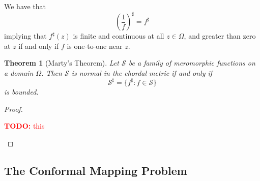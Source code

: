 \documentclass{article}
\newtheorem{theorem}{Theorem}
\newcommand{\mc}[1]{\mathcal{#1}}
\newcommand{\TODO}[1]{\begin{center}\huge{\textcolor{red}{\textbf{TODO:} #1}}\end{center}}
\begin{document}
We have that
\begin{equation}\left(\frac{1}{f}\right)^\sharp = f^\sharp\end{equation}
implying that \(f^\sharp(z)\) is finite and continuous at all \(z \in \Omega\), and greater than zero at \(z\) if and only if \(f\) is one-to-one near \(z\).
\begin{theorem}[Marty's Theorem]
Let \(\mc{S}\) be a family of meromorphic functions on a domain \(\Omega\). Then \(\mc{S}\) is normal in the chordal metric if and only if
\begin{equation}\mc{S}^\sharp = \{f^\sharp : f \in \mc{S}\}\end{equation}
is bounded.
\end{theorem}
\begin{proof}
\TODO{this}
\end{proof}

\subsection{The Conformal Mapping Problem}
\end{document}
